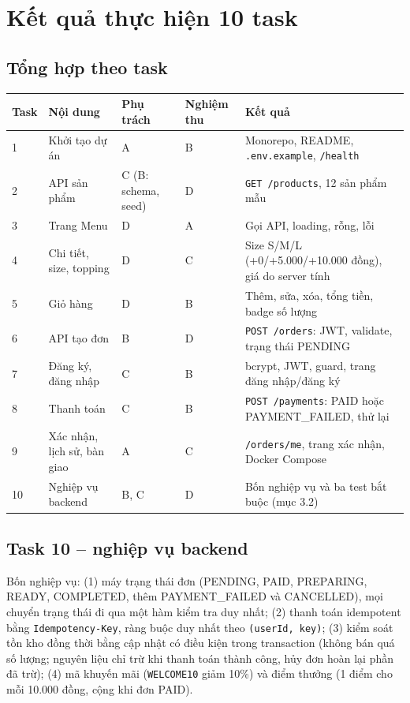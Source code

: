 \documentclass[a4paper]{article}
\begin{document}
\section{Kết quả thực hiện 10 task}
\subsection{Tổng hợp theo task}
\begin{center}
\small\everymath{}
\begin{tabular}{@{}p{0.8cm}p{3.0cm}p{2.0cm}p{1.7cm}p{5.0cm}@{}}
\toprule
\textbf{Task} & \textbf{Nội dung} & \textbf{Phụ trách} & \textbf{Nghiệm thu} & \textbf{Kết quả} \\ \midrule
1 & Khởi tạo dự án & A & B & Monorepo, README, \texttt{.env.example}, \texttt{/health} \\
2 & API sản phẩm & C (B: schema, seed) & D & \texttt{GET /products}, 12 sản phẩm mẫu \\
3 & Trang Menu & D & A & Gọi API, loading, rỗng, lỗi \\
4 & Chi tiết, size, topping & D & C & Size S/M/L (+0/+5.000/+10.000 đồng), giá do server tính \\
5 & Giỏ hàng & D & B & Thêm, sửa, xóa, tổng tiền, badge số lượng \\
6 & API tạo đơn & B & D & \texttt{POST /orders}: JWT, validate, trạng thái PENDING \\
7 & Đăng ký, đăng nhập & C & B & bcrypt, JWT, guard, trang đăng nhập/đăng ký \\
8 & Thanh toán & C & B & \texttt{POST /payments}: PAID hoặc PAYMENT\_FAILED, thử lại \\
9 & Xác nhận, lịch sử, bàn giao & A & C & \texttt{/orders/me}, trang xác nhận, Docker Compose \\
10 & Nghiệp vụ backend & B, C & D & Bốn nghiệp vụ và ba test bắt buộc (mục 3.2) \\
\bottomrule
\end{tabular}
\end{center}

\subsection{Task 10 -- nghiệp vụ backend}
Bốn nghiệp vụ: (1) máy trạng thái đơn (PENDING, PAID, PREPARING, READY, COMPLETED, thêm PAYMENT\_FAILED và CANCELLED), mọi chuyển trạng thái đi qua một hàm kiểm tra duy nhất; (2) thanh toán idempotent bằng \texttt{Idempotency-Key}, ràng buộc duy nhất theo \texttt{(userId, key)}; (3) kiểm soát tồn kho đồng thời bằng cập nhật có điều kiện trong transaction (không bán quá số lượng; nguyên liệu chỉ trừ khi thanh toán thành công, hủy đơn hoàn lại phần đã trừ); (4) mã khuyến mãi (\texttt{WELCOME10} giảm 10\%) và điểm thưởng (1 điểm cho mỗi 10.000 đồng, cộng khi đơn PAID).
\end{document}
